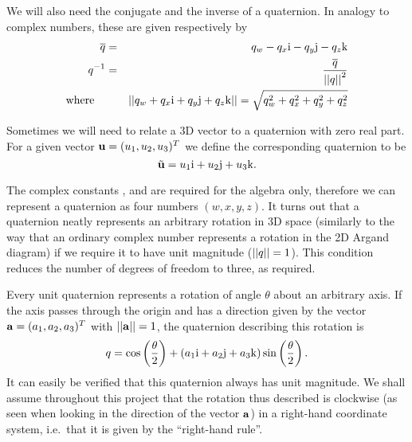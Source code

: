We will also need the conjugate and the inverse of a quaternion. In analogy to
complex numbers, these are given respectively by
\begin{eqnarray}
\overline{\mbox{$q$}} & = & q_w - q_x\mbox{$\mathrm{i}$} - q_y\mbox{$\mathrm{j}$} - q_z\mbox{$\mathrm{k}$}\\
\mbox{$q$}^{-1} & = & \frac{\overline{\mbox{$q$}}}{\mbox{$||\mbox{$q$}||$}^2}\\
\mathrm{where}\quad&& \mbox{$||q_w + q_x\mbox{$\mathrm{i}$} + q_y\mbox{$\mathrm{j}$} + q_z\mbox{$\mathrm{k}$}||$} =
    \sqrt{q_w^2 + q_x^2 + q_y^2 + q_z^2}
\end{eqnarray}

Sometimes we will need to relate a 3D vector to a quaternion with zero real part.
For a given vector $\ve{u} = (u_1, u_2, u_3)^T$ we define the corresponding
quaternion to be
\begin{equation}
\label{vectorToQuat}
\tilde{\ve{u}} = u_1\qi + u_2\qj + u_3\qk.
\end{equation}

The complex constants \qi{}, \qj{} and \qk{} are required for the algebra
only, therefore we can represent a quaternion as four numbers $(w,x,y,z)$. It turns out that a
quaternion neatly represents an arbitrary rotation in 3D space (similarly to the way that an
ordinary complex number represents a rotation in the 2D Argand diagram) if we require it to have
unit magnitude ($\mbox{$||\mbox{$q$}||$} = 1$).  This condition reduces the number of degrees of freedom to
three, as required.

Every unit quaternion represents a rotation of angle $\theta$ about an arbitrary axis.
If the axis passes through the origin and has a direction given by the vector
$\ve{a} = (a_1, a_2, a_3)^T$ with $\norm{\ve{a}} = 1$, the quaternion describing
this rotation is
\begin{equation}
\label{quatRotation}
\mbox{$q$} = \cos\left(\frac{\theta}{2}\right) + (a_1\mbox{$\mathrm{i}$} + a_2\mbox{$\mathrm{j}$} +
    a_3\mbox{$\mathrm{k}$}) \sin\left(\frac{\theta}{2}\right).
\end{equation}
It can easily be verified that this quaternion always has unit magnitude.
We shall assume throughout this project that the rotation thus described is clockwise (as seen
when looking in the direction of the vector $\ve{a}$) in a right-hand coordinate system,
i.e.\ that it is given by the ``right-hand rule''.

